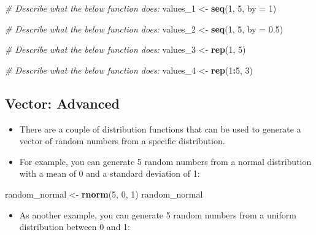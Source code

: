 \documentclass[
]{book}
\newenvironment{Shaded}{\begin{snugshade}}{\end{snugshade}}
\newcommand{\AttributeTok}[1]{\textcolor[rgb]{0.13,0.29,0.53}{#1}}
\newcommand{\CommentTok}[1]{\textcolor[rgb]{0.56,0.35,0.01}{\textit{#1}}}
\newcommand{\DecValTok}[1]{\textcolor[rgb]{0.00,0.00,0.81}{#1}}
\newcommand{\FloatTok}[1]{\textcolor[rgb]{0.00,0.00,0.81}{#1}}
\newcommand{\FunctionTok}[1]{\textcolor[rgb]{0.13,0.29,0.53}{\textbf{#1}}}
\newcommand{\NormalTok}[1]{#1}
\newcommand{\OtherTok}[1]{\textcolor[rgb]{0.56,0.35,0.01}{#1}}
\newcommand{\SpecialCharTok}[1]{\textcolor[rgb]{0.81,0.36,0.00}{\textbf{#1}}}
\providecommand{\tightlist}{%
  \setlength{\itemsep}{0pt}\setlength{\parskip}{0pt}}
\begin{document}
\begin{Shaded}
\begin{Highlighting}[]
\CommentTok{\# Describe what the below function does: }
\NormalTok{values\_1 }\OtherTok{\textless{}{-}} \FunctionTok{seq}\NormalTok{(}\DecValTok{1}\NormalTok{, }\DecValTok{5}\NormalTok{, }\AttributeTok{by =} \DecValTok{1}\NormalTok{)}

\CommentTok{\# Describe what the below function does: }
\NormalTok{values\_2 }\OtherTok{\textless{}{-}} \FunctionTok{seq}\NormalTok{(}\DecValTok{1}\NormalTok{, }\DecValTok{5}\NormalTok{, }\AttributeTok{by =} \FloatTok{0.5}\NormalTok{)}

\CommentTok{\# Describe what the below function does: }
\NormalTok{values\_3 }\OtherTok{\textless{}{-}} \FunctionTok{rep}\NormalTok{(}\DecValTok{1}\NormalTok{, }\DecValTok{5}\NormalTok{)}

\CommentTok{\# Describe what the below function does: }
\NormalTok{values\_4 }\OtherTok{\textless{}{-}} \FunctionTok{rep}\NormalTok{(}\DecValTok{1}\SpecialCharTok{:}\DecValTok{5}\NormalTok{, }\DecValTok{3}\NormalTok{)}
\end{Highlighting}
\end{Shaded}

\subsection{Vector: Advanced}\label{vector-advanced}

\begin{itemize}
\item
  There are a couple of distribution functions that can be used to generate a vector of random numbers from a specific distribution.
\item
  For example, you can generate 5 random numbers from a normal distribution with a mean of 0 and a standard deviation of 1:
\end{itemize}

\begin{Shaded}
\begin{Highlighting}[]
\NormalTok{random\_normal }\OtherTok{\textless{}{-}} \FunctionTok{rnorm}\NormalTok{(}\DecValTok{5}\NormalTok{, }\DecValTok{0}\NormalTok{, }\DecValTok{1}\NormalTok{)}
\NormalTok{random\_normal}
\end{Highlighting}
\end{Shaded}

\begin{itemize}
\tightlist
\item
  As another example, you can generate 5 random numbers from a uniform distribution between 0 and 1:
\end{itemize}
\end{document}
